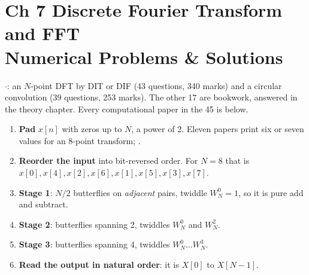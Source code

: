 \section*{\color{acc}Ch 7 \textperiodcentered{} Discrete Fourier Transform and FFT\\[2pt]
{\large\textcolor{sub}{Numerical Problems \& Solutions}}}
\vspace{-4pt}{\color{acc}\rule{\textwidth}{1.1pt}}\vspace{4pt}

{\color{sub}\footnotesize {} \gap$\cdot$\gap {}: an $N$-point
DFT by DIT or DIF (43 questions, 340 marks) and a circular convolution (39 questions,
253 marks). The other 17 are bookwork, answered in the theory chapter. Every
computational paper in the 45 is below.}

\begin{enumerate}
  \item \textbf{Pad} $x[n]$ with zeros up to $N$, a power of 2. Eleven papers print six
        or seven values for an 8-point transform; .
  \item \textbf{Reorder the input} into bit-reversed order. For $N=8$ that is
        $x[0],x[4],x[2],x[6],x[1],x[5],x[3],x[7]$.
  \item \textbf{Stage 1}: $N/2$ butterflies on \emph{adjacent} pairs, twiddle $W_N^0=1$,
        so it is pure add and subtract.
  \item \textbf{Stage 2}: butterflies spanning 2, twiddles $W_N^0$ and $W_N^{2}$.
  \item \textbf{Stage 3}: butterflies spanning 4, twiddles $W_N^0\dots W_N^{3}$.
  \item \textbf{Read the output in natural order}: it is $X[0]$ to $X[N-1]$.
\end{enumerate}

